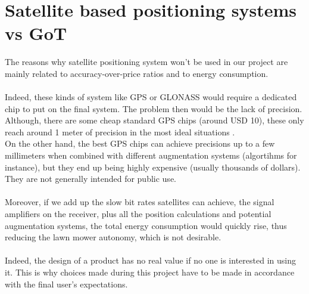 \section{Satellite based positioning systems vs GoT}
The reasons why satellite positioning system won't be used in our project are mainly related to accuracy-over-price ratios and to energy consumption.\\\\
Indeed, these kinds of system like GPS or GLONASS would require a dedicated chip to put on the final system. The problem then would be the lack of precision. Although, there are some cheap standard GPS chips (around USD 10), these only reach around 1 meter of precision in the most ideal situations \cite{GPSUSWebsiteAccuracy,Miller}. \\
On the other hand, the best GPS chips can achieve precisions up to a few millimeters \cite{GPSUSWebsiteAccuracy} when combined with different augmentation systems (algortihms for instance), but they end up being highly expensive (usually thousands of dollars). They are not generally intended for public use.
 \\\\
%
Moreover, if we add up the slow bit rates satellites can achieve, the signal amplifiers on the receiver, plus all the position calculations and potential augmentation systems, the total energy consumption would quickly rise,  thus reducing the lawn mower autonomy, which is not desirable.\\\\
%
Indeed, the design of a product has no real value if no one is interested in using it. This is why choices made during this project have to be made in accordance with the final user's expectations.